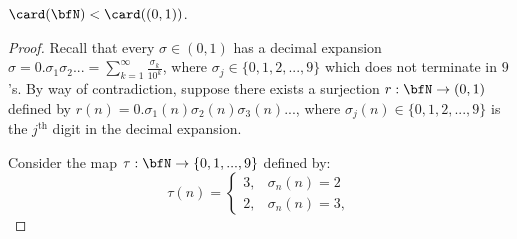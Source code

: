     \begin{theorem}\label{thm:cantors-diagonal} $\card(\bfN) < \card((0,1))$.
    \end{theorem}
        \begin{proof}
            Recall that every $\sigma \in (0,1)$ has a decimal expansion $\sigma = 0.\sigma_1 \sigma_2 ... = \sum_{k = 1}^\infty \frac{\sigma_k}{10^k}$, where $\sigma_j \in \{0,1,2,...,9\}$ which does not terminate in $9$'s. By way of contradiction, suppose there exists a surjection $r:\bfN \rightarrow (0,1)$ defined by $r(n) = 0.\sigma_1(n) \sigma_2(n) \sigma_3(n)...$, where $\sigma_j(n) \in \{0,1,2,...,9\}$ is the $j^\text{th}$ digit in the decimal expansion.

            Consider the map $\tau: \bfN \rightarrow \{0,1,...,9\}$ defined by:
                \begin{equation*}
                    \tau(n)=
                \begin{cases}
                    3,&\sigma_n(n) = 2\\
                    2,&\sigma_n(n)=3,
                \end{cases}
                \end{equation*}
            

\end{proof}
